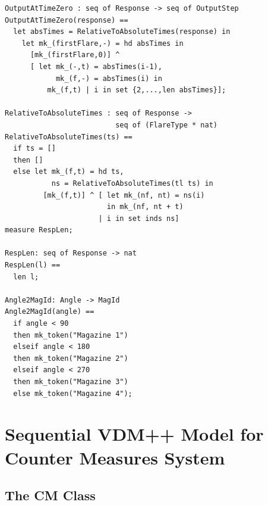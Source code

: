 \documentclass{overturerepchap}
\begin{document}
\begin{lstlisting}
OutputAtTimeZero : seq of Response -> seq of OutputStep
OutputAtTimeZero(response) ==
  let absTimes = RelativeToAbsoluteTimes(response) in
    let mk_(firstFlare,-) = hd absTimes in
      [mk_(firstFlare,0)] ^
      [ let mk_(-,t) = absTimes(i-1),
            mk_(f,-) = absTimes(i) in
          mk_(f,t) | i in set {2,...,len absTimes}];

RelativeToAbsoluteTimes : seq of Response -> 
                          seq of (FlareType * nat)
RelativeToAbsoluteTimes(ts) ==
  if ts = []
  then []
  else let mk_(f,t) = hd ts,
           ns = RelativeToAbsoluteTimes(tl ts) in
         [mk_(f,t)] ^ [ let mk_(nf, nt) = ns(i)
                        in mk_(nf, nt + t)
                      | i in set inds ns]
measure RespLen;

RespLen: seq of Response -> nat
RespLen(l) ==
  len l;

Angle2MagId: Angle -> MagId
Angle2MagId(angle) ==
  if angle < 90
  then mk_token("Magazine 1")
  elseif angle < 180
  then mk_token("Magazine 2")
  elseif angle < 270
  then mk_token("Magazine 3")
  else mk_token("Magazine 4");
\end{lstlisting}

\section{Sequential VDM++ Model for Counter Measures System}

\subsection{The CM Class}
\end{document}
